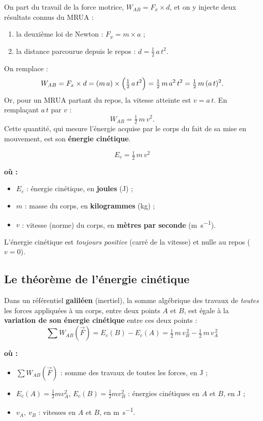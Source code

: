 \documentclass[11pt,a4paper]{article}
\newenvironment{ou}{%
  \par\smallskip\noindent\textbf{où :}\nopagebreak
  \begin{itemize}[leftmargin=1.8em,topsep=2pt,itemsep=1.5pt,parsep=0pt]}%
  {\end{itemize}}
\newcommand{\vv}[1]{\vec{#1}}
\begin{document}
\begin{methode}
On part du travail de la force motrice, $W_{AB}=F_x\times d$, et on y injecte deux résultats connus
du MRUA :
\begin{enumerate}[leftmargin=1.8em,topsep=2pt,itemsep=2pt]
  \item la deuxième loi de Newton : $F_x=m\times a$ ;
  \item la distance parcourue depuis le repos : $d=\tfrac12\,a\,t^2$.
\end{enumerate}
On remplace :
\[
W_{AB}=F_x\times d=(m\,a)\times\Bigl(\tfrac12\,a\,t^2\Bigr)=\tfrac12\,m\,a^2\,t^2=\tfrac12\,m\,(a\,t)^2 .
\]
Or, pour un MRUA partant du repos, la vitesse atteinte est $v=a\,t$. En remplaçant $a\,t$ par $v$ :
\[
W_{AB}=\tfrac12\,m\,v^2 .
\]
Cette quantité, qui mesure l'énergie acquise par le corps du fait de sa mise en mouvement, est son
\textbf{énergie cinétique}.
\end{methode}

\begin{formule}
\[
\boxed{\;E_c=\tfrac12\,m\,v^2\;}
\]
\begin{ou}
  \item $E_c$ : énergie cinétique, en \textbf{joules} (\si{\joule}) ;
  \item $m$ : masse du corps, en \textbf{kilogrammes} (\si{\kilogram}) ;
  \item $v$ : vitesse (norme) du corps, en \textbf{mètres par seconde} (\si{\metre\per\second}).
\end{ou}
L'énergie cinétique est \emph{toujours positive} (carré de la vitesse) et nulle au repos ($v=0$).
\end{formule}

\subsection{Le théorème de l'énergie cinétique}

\begin{theoreme}
Dans un référentiel \textbf{galiléen} (inertiel), la somme algébrique des travaux de \emph{toutes}
les forces appliquées à un corps, entre deux points $A$ et $B$, est égale à la \textbf{variation de
son énergie cinétique} entre ces deux points :
\[
\boxed{\;\textstyle\sum W_{AB}(\vv F)=E_c(B)-E_c(A)=\tfrac12\,m\,v_B^{\,2}-\tfrac12\,m\,v_A^{\,2}\;}
\]
\begin{ou}
  \item $\sum W_{AB}(\vv F)$ : somme des travaux de toutes les forces, en \si{\joule} ;
  \item $E_c(A)=\tfrac12 m v_A^2$, $E_c(B)=\tfrac12 m v_B^2$ : énergies cinétiques en $A$ et $B$, en \si{\joule} ;
  \item $v_A,\ v_B$ : vitesses en $A$ et $B$, en \si{\metre\per\second}.
\end{ou}
\end{theoreme}
\end{document}

